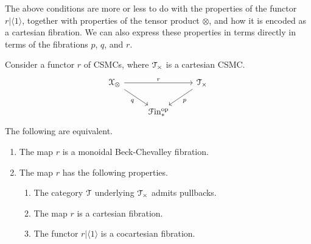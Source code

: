\documentclass[main.tex]{subfiles}
\begin{document}
The above conditions are more or less to do with the properties of the functor $r|\langle 1 \rangle$, together with properties of the tensor product $\otimes$, and how it is encoded as a cartesian fibration. We can also express these properties in terms directly in terms of the fibrations $p$, $q$, and $r$.
\begin{lemma}
  \label{lemma:equivalent_conditions_beck_chevalley_fibration}
  Consider a functor $r$ of CSMCs, where $\mathcal{T}_{\times}$ is a cartesian CSMC.
  \begin{equation*}
    \begin{tikzcd}
      \category{X}_{\otimes}
      \arrow[rr, "r"]
      \arrow[dr, swap, "q"]
      && \category{T}_{\times}
      \arrow[dl, "p"]
      \\
      & \Finp\op
    \end{tikzcd}
  \end{equation*}
  The following are equivalent.
  \begin{enumerate}
    \item The map $r$ is a monoidal Beck-Chevalley fibration.

    \item The map $r$ has the following properties.
      \begin{enumerate}
        \item The category $\mathcal{T}$ underlying $\mathcal{T}_{\times}$ admits pullbacks.

        \item The map $r$ is a cartesian fibration.

        \item The functor $r|\langle 1 \rangle$ is a cocartesian fibration.


\end{enumerate}
\end{enumerate}
\end{lemma}
\end{document}
